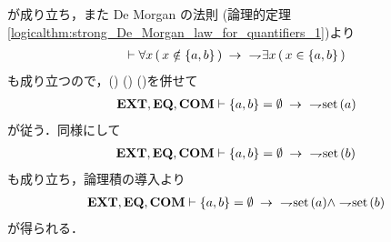 \begin{sketch}
		が成り立ち，また De Morgan の法則
		(論理的定理\ref{logicalthm:strong_De_Morgan_law_for_quantifiers_1})より
		\begin{align}
			\vdash \forall x\, (\, x \notin \{a,b\}\, ) \rarrow\ \negation \exists x\, (\, x \in \{a,b\}\, )
			\label{fom:classes_displayed_in_empty_pair_are_not_sets_3}
		\end{align}
		も成り立つので，()
		()
		()を併せて
		\begin{align}
			\EXTAX,\EQAX,\COMAX \vdash \{a,b\} = \emptyset \rarrow\ \negation \set{a}
		\end{align}
		が従う．同様にして
		\begin{align}
			\EXTAX,\EQAX,\COMAX \vdash \{a,b\} = \emptyset \rarrow\ \negation \set{b}
		\end{align}
		も成り立ち，論理積の導入より
		\begin{align}
			\EXTAX,\EQAX,\COMAX \vdash \{a,b\} = \emptyset \rarrow\ \negation \set{a} \wedge \negation \set{b}
		\end{align}
		が得られる．
		\QED
	\end{sketch}